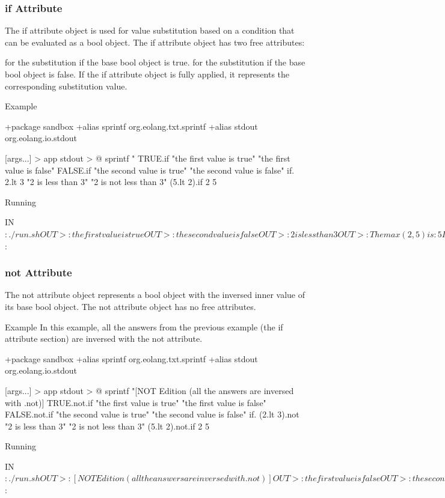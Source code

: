 \documentclass[12pt]{book}
\begin{document}
\subsubsection{if Attribute}
The if attribute object is used for value substitution based on a condition that can be evaluated as a bool object.
The if attribute object has two free attributes:

 for the substitution if the base bool object is true.
 for the substitution if the base bool object is false.
If the if attribute object is fully applied, it represents the corresponding substitution value.

Example
\begin{ffcode}
+package sandbox
+alias sprintf org.eolang.txt.sprintf
+alias stdout org.eolang.io.stdout

[args...] > app
  stdout > @
    sprintf
      "%
      TRUE.if
        "the first value is true"
        "the first value is false"
      FALSE.if
        "the second value is true"
        "the second value is false"
      if.
        2.lt 3
        "2 is less than 3"
        "2 is not less than 3"
      (5.lt 2).if
        2
        5

Running

IN$: ./run.sh
OUT>: the first value is true
OUT>: the second value is false
OUT>: 2 is less than 3
OUT>: The max(2, 5) is: 5
IN$: 
\end{ffcode}

\subsubsection{not Attribute}
The not attribute object represents a bool object with the inversed inner value of its base bool object.
The not attribute object has no free attributes.

Example
In this example, all the answers from the previous example (the if attribute section) are inversed with the not attribute.

\begin{ffcode}
+package sandbox
+alias sprintf org.eolang.txt.sprintf
+alias stdout org.eolang.io.stdout

[args...] > app
  stdout > @
    sprintf
      "[NOT Edition (all the answers are inversed with
      .not)]\n%
      TRUE.not.if
        "the first value is true"
        "the first value is false"
      FALSE.not.if
        "the second value is true"
        "the second value is false"
      if.
        (2.lt 3).not
        "2 is less than 3"
        "2 is not less than 3"
      (5.lt 2).not.if
        2
        5

Running

IN$: ./run.sh
OUT>: [NOT Edition (all the answers are inversed with
.not)]
OUT>: the first value is false
OUT>: the second value is true
OUT>: 2 is not less than 3
OUT>: The max(2, 5) is: 2
IN$: 
\end{ffcode}
\end{document}
